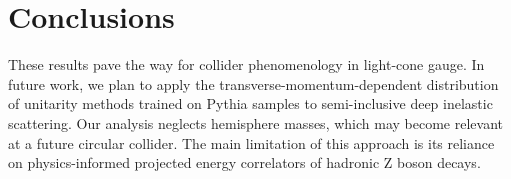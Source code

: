 \section{Conclusions}\label{sec:conclusions}

These results pave the way for collider phenomenology in light-cone
gauge. In future work, we plan to apply the
transverse-momentum-dependent distribution of unitarity methods trained
on Pythia samples to semi-inclusive deep inelastic scattering. Our
analysis neglects hemisphere masses, which may become relevant at a
future circular collider. The main limitation of this approach is its
reliance on physics-informed projected energy correlators of hadronic Z
boson decays.

